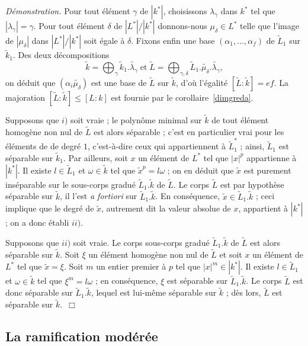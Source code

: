 \documentclass[10pt,leqno]{article}
\renewcommand{\leq}{\leqslant}
\newcommand{\red}{\widetilde}
\begin{document}
\medskip
{\em Démonstration.} Pour tout élément $\gamma$ de $|k^{*}|$, choisissons $\lambda_{\gamma}$ dans $k^{*}$ tel que $|\lambda_{\gamma}|=\gamma$. Pour tout élément $\delta$ de $|L^{*}|/|k^{*}|$ donnons-nous $\mu_{\delta}\in L^{*}$ telle que l'image de $|\mu_{\delta}|$ dans $|L^{*}|/|k^{*}|$ soit égale à $\delta$. Fixons enfin une base $(\alpha_{1},\ldots,\alpha_{f})$ de $\red{L}_1$ sur $\red{k}_1$. Des deux décompositions $$\red{k}=\bigoplus_{\gamma}\red{k}_1.\red{\lambda_{\gamma}} \;\mbox{et}\;\red{L}=\bigoplus_{\gamma,\delta} \red{L}_1.\red{\mu_{\delta}}.\red{\lambda_{\gamma}},$$ on déduit que $(\alpha_{i}\red{\mu_{\delta}})$ est une base de $\red{L}$ sur $\red{k}$, d'où l'égalité $[\red{L}:\red{k}]=ef$. La majoration $[\red{L}:\red{k}]\leq [L:k]$ est fournie par le corollaire~\ref{dimgreda}.


\medskip
Supposons que $i)$ soit vraie ; le polynôme minimal sur $\red{k}$ de tout élément homogène non nul de $\red{L}$ est alors séparable ; c'est en particulier vrai pour les éléments de de degré $1$, c'est-à-dire ceux qui appartiennent à $\red{L}_1^{*}$ ; ainsi, $\red{L}_1$ est séparable sur $\red{k}_1$. Par ailleurs, soit $x$ un élément de $L^{*}$ tel que $|x|^{p}$ appartienne à $|k^{*}|$. Il existe $l\in\red{L}_1$ et $\omega\in \red{k}$ tel que $\red{x}^{p}=l\omega$ ; on en déduit que $\red{x}$ est purement inséparable sur le sous-corps gradué $\red{L}_1.\red{k}$ de $\red{L}$. Le corps $\red{L}$ est par hypothèse séparable sur $\red{k}$, il l'est {\em a fortiori} sur $\red{L}_1.\red{k}$. En conséquence, $\red{x}\in \red{L}_1.\red{k}$ ; ceci implique que le degré de $\red{x}$, autrement dit la valeur absolue de $x$, appartient à $|k^{*}|$ ; on a donc établi $ii)$. 

\medskip
Supposons que $ii)$ soit vraie. Le corps sous-corps gradué $\red{L}_1.\red{k}$ de $\red{L}$ est alors séparable sur $\red{k}$. Soit $\xi$ un élément homogène non nul de $\red{L}$ et soit $x$ un élément de $L^{*}$ tel que $\red{x}=\xi$. Soit $m$ un entier premier à $p$ tel que $|x|^{m}\in |k^{*}|$. Il existe $l\in \red{L}_1$ et $\omega\in \red{k}$ tel que $\xi^{m}=l\omega$ ; en conséquence, $\xi$ est séparable sur $\red{L}_1.\red{k}$. Le corps $\red{L}$ est donc séparable sur $\red{L}_1.\red{k}$, lequel est lui-même séparable sur $\red{k}$ ; dès lors, $\red{L}$ est séparable sur $\red{k}$.~$\Box$ 




\subsection*{La ramification modérée}
\end{document}
